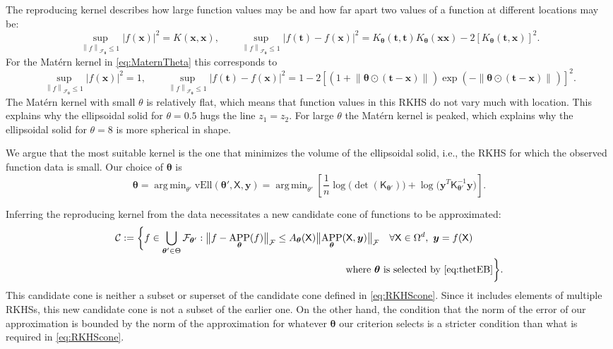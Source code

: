 \documentclass[]{mcom-l}
\theoremstyle{remark}
\newcommand{\vEll}{\text{vEll}}
\DeclareMathOperator*{\argmin}{arg\,min}
\DeclareMathOperator{\APP}{APP}
\newcommand{\mK}{\mathsf{K}}
\newcommand{\mX}{\mathsf{X}}
\newcommand{\bx}{{\boldsymbol{x}}}
\newcommand{\by}{{\boldsymbol{y}}}
\newcommand{\bt}{{\boldsymbol{t}}}
\newcommand{\btheta}{{\boldsymbol{\theta}}}
\newcommand{\calc}{{\mathcal{C}}}
\newcommand{\calf}{{\mathcal{F}}}
\def\abs#1{\ensuremath{\left \lvert #1 \right \rvert}}
\newcommand{\norm}[2][{}]{\ensuremath{\left \lVert #2 \right \rVert}_{#1}}
\newcommand{\bignorm}[2][{}]{\ensuremath{\bigl \lVert #2 \bigr \rVert}_{#1}}
\begin{document}
The reproducing kernel describes how large function values may be and how far apart two values of a function at different locations may be:
\begin{equation} \label{eq:diff_f}
\sup_{\norm[\calf_{\btheta}]{f} \le 1} \abs{f(\bx)}^2 = K(\bx,\bx), \qquad    \sup_{\norm[\calf_{\btheta}]{f} \le 1} \abs{f(\bt) - f(\bx)}^2 = K_{\btheta}(\bt,\bt) K_{\btheta}(\bx\bx) - 2 [K_{\btheta}(\bt,\bx)]^2.
\end{equation}
For the Mat\'ern kernel in \eqref{eq:MaternTheta} this corresponds to 
\begin{equation} \label{eq:diff_f_Matern}
\sup_{\norm[\calf_{\btheta}]{f} \le 1} \abs{f(\bx)}^2 = 1, \qquad 
\sup_{\norm[\calf_{\btheta}]{f} \le 1} \abs{f(\bt) - f(\bx)}^2 = 1 - 2 [(1 +  \norm{\btheta \odot (\bt-\bx)}) \exp(-\norm{\btheta \odot (\bt-\bx)})]^2.
\end{equation}
The Mat\'ern kernel with small $\theta$ is relatively flat, which means that function values in this RKHS do not vary much with location.  This explains why the ellipsoidal solid for $\theta = 0.5$ hugs the line $z_1 = z_2$.  For large $\theta$ the Mat\'ern kernel is peaked, which explains why the ellipsoidal solid for $\theta = 8$ is more spherical in shape.



We argue that the most suitable kernel is the one that minimizes the volume of the ellipsoidal solid, i.e., the RKHS for which the observed function data is small.   Our choice of $\btheta$ is
\begin{equation} \label{eq:thetEB}
\btheta  =  \argmin_{\theta'}  \vEll(\btheta' ,\mX,\by) 
 = \argmin_{\theta'}  \left[\frac 1n \log \bigl( \det(\mK_{\btheta'}) \bigr) + \log \bigl ( \by^T \mK_{\btheta'}^{-1} \by \bigr)\right].
\end{equation}

Inferring the reproducing kernel from the data necessitates a new candidate cone of functions to be approximated:
\begin{align} \label{eq:RKHSconeTheta}
\calc &: = \biggl \{f \in \bigcup_{\btheta' \in \Theta} \calf_{\btheta'} : \bignorm[\calf]{f - \APP_{\btheta}(f)} \le A_{\btheta}(\mX) \bignorm[\calf]{\APP_{\btheta}(\mX,\by)} \quad \forall \mX \in \Omega^d, \ \by = f(\mX) \\
& \hspace{8cm} \text{where $\btheta$ is selected by \eqref{eq:thetEB}} \biggr \}.
\nonumber
\end{align}
This candidate cone is neither a subset or superset of the candidate cone defined in \eqref{eq:RKHScone}.  Since it includes elements of multiple RKHSs, this new candidate cone is not a subset of the earlier one.  On the other hand, the condition that  the norm of the error of our approximation is bounded by the norm of the approximation for whatever $\btheta$ our criterion selects is a stricter condition than what is required in \eqref{eq:RKHScone}. 
\end{document}
